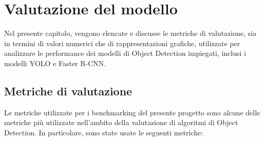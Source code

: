 \documentclass[12pt]{article}
\begin{document}
\section{Valutazione del modello}
Nel presente capitolo, vengono elencate e discusse le metriche di valutazione, sia in termini di valori numerici che di rappresentazioni grafiche, utilizzate per analizzare le performance dei modelli di Object Detection impiegati, inclusi i modelli YOLO e Faster R-CNN.

\subsection{Metriche di valutazione}
Le metriche utilizzate per i benchmarking del presente progetto sono alcune delle metriche più utilizzate nell’ambito della valutazione di algoritmi di Object Detection. In particolare, sono state usate le seguenti metriche:
\end{document}
